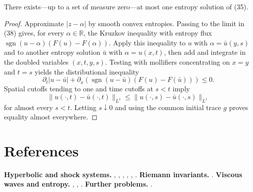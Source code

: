 \begin{theorem}
\label{thm:uniqueness-entropy-solutions-scalar-new}
There exists---up to a set of measure zero---at most one entropy solution of (35).
\end{theorem}

\begin{proof}
\sketch Approximate $|z-\alpha|$ by smooth convex entropies. Passing to the limit in (38) gives, for every $\alpha\in\mathbb R$, the Kruzkov inequality with entropy flux
$\operatorname{sgn}(u-\alpha)(F(u)-F(\alpha))$. Apply this inequality to $u$ with $\alpha=\bar u(y,s)$ and to another entropy solution $\bar u$ with $\alpha=u(x,t)$, then add and integrate in the doubled variables $(x,t,y,s)$. Testing with mollifiers concentrating on $x=y$ and $t=s$ yields the distributional inequality
\[
\partial_t|u-\bar u|
+\partial_x\!\left(\operatorname{sgn}(u-\bar u)(F(u)-F(\bar u))\right)\leq0.
\]
Spatial cutoffs tending to one and time cutoffs at $s<t$ imply
\[
\|u(\cdot,t)-\bar u(\cdot,t)\|_{L^1}
\leq\|u(\cdot,s)-\bar u(\cdot,s)\|_{L^1}
\]
for almost every $s<t$. Letting $s\downarrow0$ and using the common initial trace $g$ proves equality almost everywhere.
\end{proof}

\section{References}\label{sec:chapter11-references}
\textbf{Hyperbolic and shock systems.} \cite{Zheng2001}, \cite{Conlon1980}, \cite{LeVeque1992}, \cite{CourantFriedrichs1976}, \cite{XiaoZhang1989}, \cite{Zheng2001}.
\textbf{Riemann invariants.} \cite{Logan1987}.
\textbf{Viscous waves and entropy.} \cite{MajdaPego1985}, \cite{Conlon1980}, \cite{Smoller1983}.
\textbf{Further problems.} \cite{Kato1980}.
